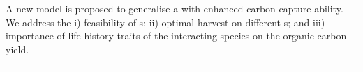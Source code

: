 \documentclass[env.tex]{subfiles}
\begin{document}
A new model is proposed to generalise a \pbs with enhanced carbon capture ability.  We address the \Rn{1}) feasibility of \pbs s; \Rn{2}) optimal harvest on different \pbs s; and \Rn{3}) importance of life history traits of the interacting species on the organic carbon yield.

\noindent\rule{10cm}{4pt}




\end{document}
